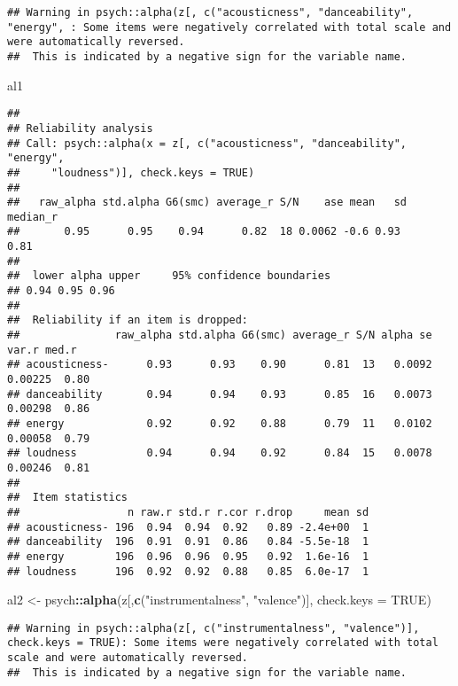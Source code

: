 \documentclass[
]{article}
\newenvironment{Shaded}{\begin{snugshade}}{\end{snugshade}}
\newcommand{\DataTypeTok}[1]{\textcolor[rgb]{0.13,0.29,0.53}{#1}}
\newcommand{\KeywordTok}[1]{\textcolor[rgb]{0.13,0.29,0.53}{\textbf{#1}}}
\newcommand{\NormalTok}[1]{#1}
\newcommand{\OperatorTok}[1]{\textcolor[rgb]{0.81,0.36,0.00}{\textbf{#1}}}
\newcommand{\OtherTok}[1]{\textcolor[rgb]{0.56,0.35,0.01}{#1}}
\newcommand{\StringTok}[1]{\textcolor[rgb]{0.31,0.60,0.02}{#1}}
\begin{document}
\begin{verbatim}
## Warning in psych::alpha(z[, c("acousticness", "danceability", "energy", : Some items were negatively correlated with total scale and were automatically reversed.
##  This is indicated by a negative sign for the variable name.
\end{verbatim}

\begin{Shaded}
\begin{Highlighting}[]
\NormalTok{al1}
\end{Highlighting}
\end{Shaded}

\begin{verbatim}
## 
## Reliability analysis   
## Call: psych::alpha(x = z[, c("acousticness", "danceability", "energy", 
##     "loudness")], check.keys = TRUE)
## 
##   raw_alpha std.alpha G6(smc) average_r S/N    ase mean   sd median_r
##       0.95      0.95    0.94      0.82  18 0.0062 -0.6 0.93     0.81
## 
##  lower alpha upper     95% confidence boundaries
## 0.94 0.95 0.96 
## 
##  Reliability if an item is dropped:
##               raw_alpha std.alpha G6(smc) average_r S/N alpha se   var.r med.r
## acousticness-      0.93      0.93    0.90      0.81  13   0.0092 0.00225  0.80
## danceability       0.94      0.94    0.93      0.85  16   0.0073 0.00298  0.86
## energy             0.92      0.92    0.88      0.79  11   0.0102 0.00058  0.79
## loudness           0.94      0.94    0.92      0.84  15   0.0078 0.00246  0.81
## 
##  Item statistics 
##                 n raw.r std.r r.cor r.drop     mean sd
## acousticness- 196  0.94  0.94  0.92   0.89 -2.4e+00  1
## danceability  196  0.91  0.91  0.86   0.84 -5.5e-18  1
## energy        196  0.96  0.96  0.95   0.92  1.6e-16  1
## loudness      196  0.92  0.92  0.88   0.85  6.0e-17  1
\end{verbatim}

\begin{Shaded}
\begin{Highlighting}[]
\NormalTok{al2 <-}\StringTok{ }\NormalTok{psych}\OperatorTok{::}\KeywordTok{alpha}\NormalTok{(z[,}\KeywordTok{c}\NormalTok{(}\StringTok{"instrumentalness"}\NormalTok{, }\StringTok{"valence"}\NormalTok{)], }\DataTypeTok{check.keys =} \OtherTok{TRUE}\NormalTok{)}
\end{Highlighting}
\end{Shaded}

\begin{verbatim}
## Warning in psych::alpha(z[, c("instrumentalness", "valence")], check.keys = TRUE): Some items were negatively correlated with total scale and were automatically reversed.
##  This is indicated by a negative sign for the variable name.
\end{verbatim}
\end{document}
